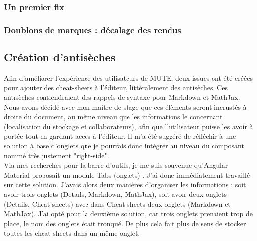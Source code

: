 \documentclass[12pt]{article}
\begin{document}
\subsubsection{Un premier fix}

\subsubsection{Doublons de marques : décalage des rendus}

\newpage
\subsection{Création d'antisèches}
Afin d'améliorer l'expérience des utilisateurs de MUTE, deux issues ont été créées pour ajouter des cheat-sheets à l'éditeur, littéralement des antisèches. Ces antisèches contiendraient des rappels de syntaxe pour Markdown et MathJax. Nous avons décidé avec mon maître de stage que ces éléments seront incrustés à droite du document, au même niveau que les informations le concernant (localisation du stockage et collaborateurs), afin que l'utilisateur puisse les avoir à portée tout en gardant accès à l'éditeur. Il m'a été suggéré de réfléchir à une solution à base d'onglets que je pourrais donc intégrer au niveau du composant nommé très justement "right-side".\\
Via mes recherches pour la barre d'outils, je me suis souvenue qu'Angular Material proposait un module Tabs (onglets) \cite{tabs}. J'ai donc immédiatement travaillé sur cette solution. J'avais alors deux manières d'organiser les informations : soit avoir trois onglets (Details, Markdown, MathJax), soit avoir deux onglets (Details, Cheat-sheets) avec dans Cheat-sheets deux onglets (Markdown et MathJax). J'ai opté pour la deuxième solution, car trois onglets prenaient trop de place, le nom des onglets était tronqué. De plus cela fait plus de sens de stocker toutes les cheat-sheets dans un même onglet.
\end{document}
